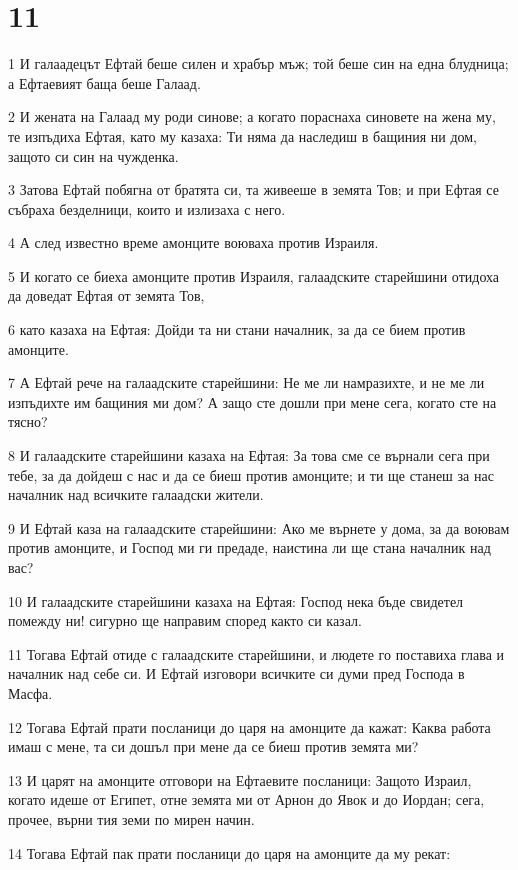 \chapter{11}

\par 1 И галаадецът Ефтай беше силен и храбър мъж; той беше син на една блудница; а Ефтаевият баща беше Галаад.
\par 2 И жената на Галаад му роди синове; а когато пораснаха синовете на жена му, те изпъдиха Ефтая, като му казаха: Ти няма да наследиш в бащиния ни дом, защото си син на чужденка.
\par 3 Затова Ефтай побягна от братята си, та живееше в земята Тов; и при Ефтая се събраха безделници, които и излизаха с него.
\par 4 А след известно време амонците воюваха против Израиля.
\par 5 И когато се биеха амонците против Израиля, галаадските старейшини отидоха да доведат Ефтая от земята Тов,
\par 6 като казаха на Ефтая: Дойди та ни стани началник, за да се бием против амонците.
\par 7 А Ефтай рече на галаадските старейшини: Не ме ли намразихте, и не ме ли изпъдихте им бащиния ми дом? А защо сте дошли при мене сега, когато сте на тясно?
\par 8 И галаадските старейшини казаха на Ефтая: За това сме се върнали сега при тебе, за да дойдеш с нас и да се биеш против амонците; и ти ще станеш за нас началник над всичките галаадски жители.
\par 9 И Ефтай каза на галаадските старейшини: Ако ме върнете у дома, за да воювам против амонците, и Господ ми ги предаде, наистина ли ще стана началник над вас?
\par 10 И галаадските старейшини казаха на Ефтая: Господ нека бъде свидетел помежду ни! сигурно ще направим според както си казал.
\par 11 Тогава Ефтай отиде с галаадските старейшини, и людете го поставиха глава и началник над себе си. И Ефтай изговори всичките си думи пред Господа в Масфа.
\par 12 Тогава Ефтай прати посланици до царя на амонците да кажат: Каква работа имаш с мене, та си дошъл при мене да се биеш против земята ми?
\par 13 И царят на амонците отговори на Ефтаевите посланици: Защото Израил, когато идеше от Египет, отне земята ми от Арнон до Явок и до Иордан; сега, прочее, върни тия земи по мирен начин.
\par 14 Тогава Ефтай пак прати посланици до царя на амонците да му рекат:
